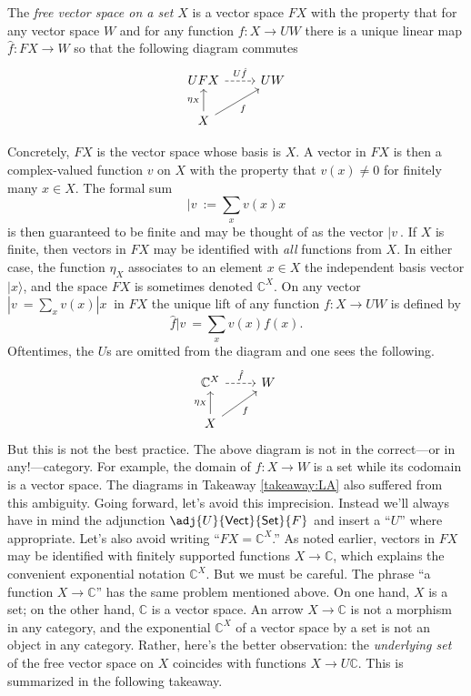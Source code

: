 \begin{UP_vect} The \textit{free vector space on a set $X$} is a vector space $FX$ with the property that for any vector space $W$ and for any function $f\colon X\to UW$ there is a unique linear map $\hat f\colon FX\to W$ so that the following diagram commutes
\[
  \begin{tikzcd}
  UFX \arrow[r, "U\hat f", dashed]                  & UW \\
  X \arrow[ru, "f"'] \arrow[u, "\eta_X"] &   
  \end{tikzcd}
\]
\end{UP_vect}
\noindent Concretely, $FX$ is the vector space whose basis is $X$. A vector in $FX$ is then a complex-valued function $v$ on $X$ with the property that $v(x)\neq 0$ for finitely many $x\in X$. The formal sum
\begin{equation}\label{eq:LA_yoneda}
|v\>:=\sum_x v(x)x
\end{equation}
is then guaranteed to be finite and may be thought of as the vector $|v\>$. If $X$ is finite, then vectors in $FX$ may be identified with \textit{all} functions from $X$. In either case, the function $\eta_X$ associates to an element $x\in X$ the independent basis vector $|x\rangle$, and the space $FX$ is sometimes denoted $\mathbb{C}^X$. On any vector $|v\>=\sum_x v(x) |x\>$ in $FX$ the unique lift of any function $f\colon X\to UW$ is defined by
\begin{equation}\label{eq:LA_lift}
\hat f|v\>=\sum_xv(x)f(x).
\end{equation}
Oftentimes, the $U$s are omitted from the diagram and one sees the following.
\[
  \begin{tikzcd}
  \mathbb{C}^X \arrow[r, "\hat f", dashed]                  & W \\
  X \arrow[ru, "f"'] \arrow[u, "\eta_X"] &   
  \end{tikzcd}
\]
But this is not the best practice. The above diagram is not in the correct---or in any!---category. For example, the domain of $f\colon X\to W$ is a set while its codomain is a vector space. The diagrams in Takeaway  \ref{takeaway:LA} also suffered from this ambiguity. Going forward, let's avoid this imprecision. Instead we'll always have in mind the adjunction $\adj{U}{\mathsf{Vect}}{\mathsf{Set}}{F}$ and insert a ``$U$'' where appropriate. Let's also avoid writing ``$FX=\mathbb{C}^X$.'' As noted earlier, vectors in $FX$ may be identified with finitely supported functions $X\to \mathbb{C}$, which explains the convenient exponential notation $\mathbb{C}^X$. But we must be careful. The phrase ``a function $X\to \mathbb{C}$'' has the same problem mentioned above.  On one hand, $X$ is a set; on the other hand, $\mathbb{C}$ is a vector space. An arrow $X\to \mathbb{C}$ is not a morphism in any category, and the exponential $\mathbb{C}^X$ of a vector space by a set is not an object in any category. Rather, here's the better observation: the \textit{underlying set} of the free vector space on $X$ coincides with functions $X\to U\mathbb{C}$. This is summarized in the following takeaway.
